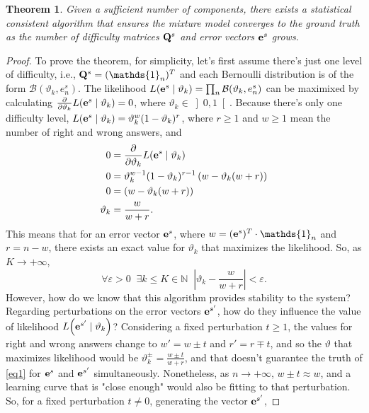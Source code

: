 \documentclass{article}
\newtheorem{theorem}{Theorem}
\newcommand{\0}{\mathbbold{0}}
\newcommand{\1}{\mathds{1}}
\newcommand{\Lh}[2]{L\!\left(#1 \mid #2\right)}
\newcommand{\openinter}[2]{\left]#1,#2\right[}
\begin{document}
\begin{theorem}
    Given a sufficient number of components, there exists a statistical consistent algorithm that ensures the mixture model converges to the ground truth as the number of difficulty matrices ${\bf Q}^s$ and error vectors ${\bf e}^s$ grows.
\end{theorem}
\begin{proof}
    To prove the theorem, for simplicity, let's first assume there's just one level of difficulty, i.e., ${\bf Q}^s = (\1_n)^T$ and each Bernoulli distribution is of the form $\mathcal{B}(\vartheta_k, e^s_n)$.
    The likelihood $\Lh{{\bf e}^s}{\vartheta_k} = \prod_n \mathcal{B}(\vartheta_k, e^s_n)$ can be maximixed by calculating $\frac{\partial}{\partial \vartheta_k} \Lh{{\bf e}^s}{\vartheta_k} = 0 $, where $\vartheta_k \in \openinter{0}{1}$.
    Because there's only one difficulty level, $\Lh{{\bf e}^s}{\vartheta_k} = \vartheta_k^w(1-\vartheta_k)^r$, where $r \ge 1$ and $w \ge 1$ mean the number of right and wrong answers, and
    \begin{align*}
        0 &= \frac{\partial}{\partial \vartheta_k} \Lh{{\bf e}^s}{\vartheta_k} \\
        0 &= \vartheta_k^{w-1}(1-\vartheta_k)^{r-1}\left(w - \vartheta_k(w + r)\right) \\
        0 &= \left(w - \vartheta_k(w + r)\right) \\
        \vartheta_k &= \frac{w}{w+r}.
    \end{align*}
    This means that for an error vector ${\bf e}^s$, where $w = ({\bf e}^s)^T \cdot \1_n$ and $r = n - w$, there exists an exact value for $\vartheta_k$ that maximizes the likelihood.
    So, as $K \rightarrow +\infty$,
    \begin{equation}
        \forall \varepsilon > 0 \;\; \exists k \le K \in \mathbb{N} \;\; \left| \vartheta_k - \frac{w}{w+r} \right| < \varepsilon. \label{eq1}
    \end{equation}
    However, how do we know that this algorithm provides stability to the system? Regarding perturbations on the error vectors ${\bf e}^{s'}$, how do they influence the value of likelihood $\Lh{{\bf e}^{s'}}{\vartheta_k}$?
    Considering a fixed perturbation $t \ge 1$, the values for right and wrong answers change to $w' = w \pm t$ and $r' = r \mp t$, and so the $\vartheta$ that maximizes likelihood would be $\vartheta_k^\pm = \frac{w \pm t}{w+r}$,
    and that doesn't guarantee the truth of \eqref{eq1} for ${\bf e}^s$ and ${\bf e}^{s'}$ simultaneously.
    Nonetheless, as $n \rightarrow +\infty$, $w \pm t \approx w$, and a learning curve that is "close enough" would also be fitting to that perturbation. So, for a fixed perturbation $t \ne 0$, generating the vector ${\bf e}^{s'}$,

\end{proof}
\end{document}
